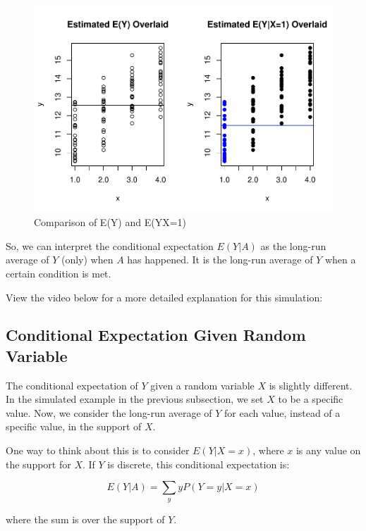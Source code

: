 \documentclass[
]{book}
\begin{document}
\begin{figure}
\centering
\includegraphics{bookdown-demo_files/figure-latex/5-condexp-1.pdf}
\caption{\label{fig:5-condexp}Comparison of E(Y) and E(Y\textbar X=1)}
\end{figure}

So, we can interpret the conditional expectation \(E(Y|A)\) as the long-run average of \(Y\) (only) when \(A\) has happened. It is the long-run average of \(Y\) when a certain condition is met.

View the video below for a more detailed explanation for this simulation:

\subsection{Conditional Expectation Given Random Variable}\label{conditional-expectation-given-random-variable}

The conditional expectation of \(Y\) given a random variable \(X\) is slightly different. In the simulated example in the previous subsection, we set \(X\) to be a specific value. Now, we consider the long-run average of \(Y\) for each value, instead of a specific value, in the support of \(X\).

One way to think about this is to consider \(E(Y|X=x)\), where \(x\) is any value on the support for \(X\). If \(Y\) is discrete, this conditional expectation is:

\begin{equation} 
E(Y|A) = \sum_y y P(Y=y|X=x) 
\label{eq:5-condexpdis2}
\end{equation}

where the sum is over the support of \(Y\).
\end{document}
